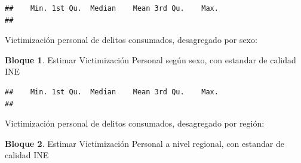 \documentclass[]{book}
\newenvironment{Shaded}{\begin{snugshade}}{\end{snugshade}}
\newcommand{\DataTypeTok}[1]{\textcolor[rgb]{0.13,0.29,0.53}{#1}}
\newcommand{\KeywordTok}[1]{\textcolor[rgb]{0.13,0.29,0.53}{\textbf{#1}}}
\newcommand{\NormalTok}[1]{#1}
\newcommand{\OperatorTok}[1]{\textcolor[rgb]{0.81,0.36,0.00}{\textbf{#1}}}
\newcommand{\StringTok}[1]{\textcolor[rgb]{0.31,0.60,0.02}{#1}}
\theoremstyle{definition}
\theoremstyle{definition}
\newtheorem{example}{Bloque}[chapter]
\theoremstyle{definition}
\theoremstyle{definition}
\theoremstyle{remark}
\begin{document}
\begin{verbatim}
##    Min. 1st Qu.  Median    Mean 3rd Qu.    Max. 
## 
\end{verbatim}

Victimización personal de delitos consumados, desagregado por sexo:

\begin{example}
\protect\hypertarget{exm:bloque77nbm}{}{\label{exm:bloque77nbm} }Estimar Victimización Personal según sexo, con estandar de calidad INE
\end{example}

\begin{Shaded}
\end{Shaded}

\begin{verbatim}
##    Min. 1st Qu.  Median    Mean 3rd Qu.    Max. 
## 
\end{verbatim}

Victimización personal de delitos consumados, desagregado por región:

\begin{example}
\protect\hypertarget{exm:bloque78nbm}{}{\label{exm:bloque78nbm} }Estimar Victimización Personal a nivel regional, con estandar de calidad INE
\end{example}

\begin{Shaded}
\end{Shaded}
\end{document}
